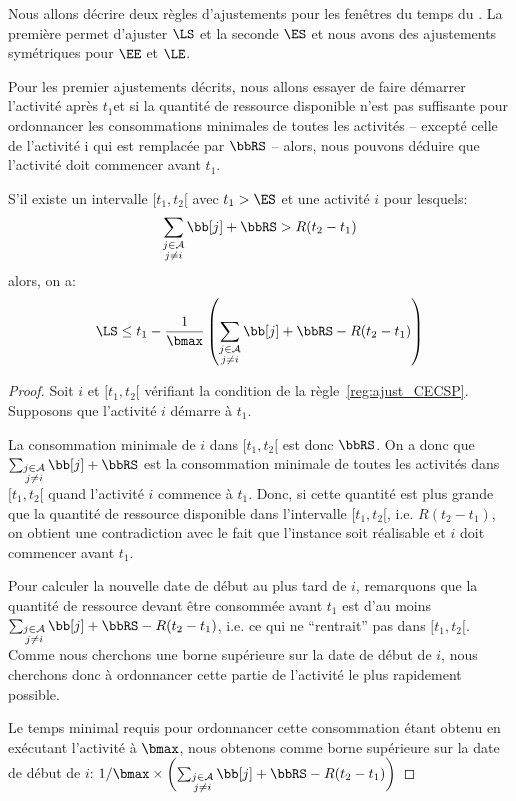 Nous allons décrire deux règles d'ajustements pour les fenêtres du
temps du \CECSP. La première permet d'ajuster $\LS$ et la seconde
$\ES$ et nous avons des ajustements symétriques pour $\EE$ et $\LE$. 

Pour les premier ajustements décrits, nous allons essayer de faire
démarrer l'activité après $t_1$et si la quantité de ressource
disponible n’est pas suffisante pour ordonnancer les consommations
minimales de toutes les activités – excepté celle de l’activité i qui
est remplacée par $\bbRS$ – alors, nous pouvons déduire que l’activité
doit commencer avant $t_1$.

\begin{reg}
\label{reg:ajust_CECSP}
S’il existe un intervalle $[t_1 , t_2 [$ avec $t_1 > \ES$ et une
activité $i$ pour lesquels:
\[ \sum_{\substack{j \in \A\\ j\neq i}} \bb[j] + \bbRS > R(t_2-t_1)
\]
alors, on a:
\[ \LS \le t_1 - \frac{1}{\bmax}\left(\sum_{\substack{j \in \A\\ j\neq i}} \bb[j] + \bbRS - R(t_2-t_1)\right)
\]
\end{reg}

\begin{proof}
Soit $i$ et $[t_1,t_2[$ vérifiant la condition de la
règle~\ref{reg:ajust_CECSP}. Supposons que l'activité $i$ démarre à
$t_1$. 

La consommation minimale de $i$ dans $[t_1,t_2[$ est donc $\bbRS$. On
a donc que $\sum_{\substack{j \in \A\\ j\neq i}} \bb[j] + \bbRS $ est
la consommation minimale de toutes les activités dans $[t_1,t_2[$
quand l'activité $i$ commence à $t_1$. Donc, si cette quantité est
plus grande que la quantité de ressource disponible dans l'intervalle
$[t_1,t_2[$, i.e. $R(t_2-t_1)$, on obtient une contradiction avec le
fait que l'instance soit réalisable et $i$ doit commencer avant
$t_1$. 

Pour calculer la nouvelle date de début au plus tard de $i$,
remarquons que la quantité de ressource devant être consommée avant
$t_1$ est d'au moins $\sum_{\substack{j \in \A\\ j\neq i}} \bb[j] +
\bbRS - R(t_2-t_1)$, i.e. ce qui ne ``rentrait'' pas dans
$[t_1,t_2[$. Comme nous cherchons une borne supérieure sur la date de
début de $i$, nous cherchons donc à ordonnancer cette partie de
l'activité le plus rapidement possible. 

Le temps minimal requis pour ordonnancer cette
consommation étant obtenu en exécutant l'activité à $\bmax$, nous
obtenons comme borne supérieure sur la date de début de $i$:
$1/\bmax \times \left(\sum_{\substack{j \in \A\\ j\neq
i}} \bb[j] + \bbRS - R(t_2-t_1)\right)$
\end{proof}

